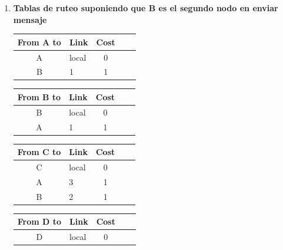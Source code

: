 \begin{enumerate}
\begin{enumerate}
        \item[] \textbf{Tablas de ruteo suponiendo que B es el segundo nodo en enviar mensaje}
        \begin{table}[H]
            \begin{tabular}{@{}clcll@{}}
                \toprule
                From A to            & \multicolumn{1}{c}{Link} & Cost                 \\ \midrule
                A                    & local                    & 0                    \\
                B                    & 1                        & 1                    \\ \bottomrule
            \end{tabular}
            \hfill
            \begin{tabular}{@{}clcll@{}}
                \toprule
                From B to            & \multicolumn{1}{c}{Link} & Cost                 \\ \midrule
                B                    & local                    & 0                    \\ 
                A                    & 1                        & 1                    \\ \bottomrule
            \end{tabular}
            \hfill
            \begin{tabular}{@{}clcll@{}}
                \toprule
                From C to            & \multicolumn{1}{c}{Link} & Cost                 \\ \midrule
                C                    & local                    & 0                    \\ 
                A                    & 3                        & 1                    \\
                B                    & 2                        & 1                    \\ \bottomrule
            \end{tabular}
        \end{table}
        \begin{table}[H]
            \begin{tabular}{@{}clcll@{}}
                \toprule
                From D to            & \multicolumn{1}{c}{Link} & Cost                 \\ \midrule
                D                    & local                    & 0                    \\ 

\end{tabular}
\end{table}
\end{enumerate}
\end{enumerate}
